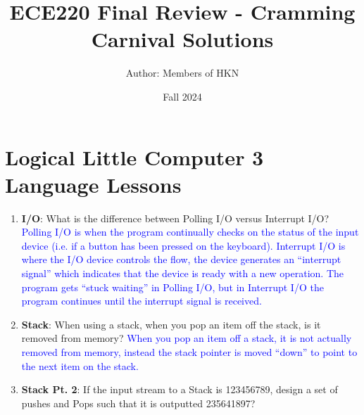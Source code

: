 \documentclass{article}
\title{ECE220 Final Review - Cramming Carnival Solutions}
\author{Author: Members of HKN}
\date{Fall 2024}
\begin{document}
\maketitle

\section{
Logical Little Computer 3 Language Lessons}
\begin{enumerate}[label=(\alph*)]
    \item \textbf{I/O}: What is the difference between Polling I/O versus Interrupt I/O?
    \newline\textcolor{blue}{
    Polling I/O is when the program continually checks on the status of the input device (i.e. if a button has been pressed on the keyboard). Interrupt I/O is where the I/O device controls the flow, the device generates an “interrupt signal” which indicates that the device is ready with a new operation. The program gets “stuck waiting” in Polling I/O, but in Interrupt I/O the program continues until the interrupt signal is received.}

    \item \textbf{Stack}: When using a stack, when you pop an item off the stack, is it removed from memory?
    \newline\textcolor{blue}{When you pop an item off a stack, it is not actually removed from memory, instead the stack pointer is moved “down” to point to the next item on the stack.}
    
    \item \textbf{Stack Pt. 2}: If the input stream to a Stack is 123456789, design a set of pushes and Pops such that it is outputted 235641897?


\end{enumerate}
\end{document}
